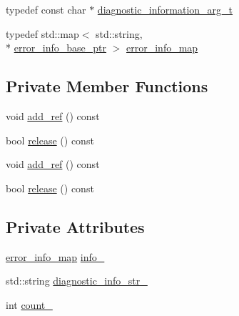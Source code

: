 \begin{DoxyCompactItemize}
\item 
typedef const char $\ast$ \hyperlink{classecto_1_1except_1_1error__info__container__impl_a16f5ebd1abcacd60ddbd919ea166958e}{diagnostic\-\_\-information\-\_\-arg\-\_\-t}
\item 
typedef std\-::map$<$ std\-::string, \\*
\hyperlink{classecto_1_1except_1_1error__info__container__impl_a9fbca0758380cb123f790aee77d1d4d8}{error\-\_\-info\-\_\-base\-\_\-ptr} $>$ \hyperlink{classecto_1_1except_1_1error__info__container__impl_a20b3846bc393224fe282eb64a40ee83d}{error\-\_\-info\-\_\-map}
\end{DoxyCompactItemize}
\subsection*{Private Member Functions}
\begin{DoxyCompactItemize}
\item 
void \hyperlink{classecto_1_1except_1_1error__info__container__impl_ae931c5c31454852cdf3d1a84d1d588eb}{add\-\_\-ref} () const 
\item 
bool \hyperlink{classecto_1_1except_1_1error__info__container__impl_a59b8d31c21da10236de67f0a5bfdf4dd}{release} () const 
\item 
void \hyperlink{classecto_1_1except_1_1error__info__container__impl_ae931c5c31454852cdf3d1a84d1d588eb}{add\-\_\-ref} () const 
\item 
bool \hyperlink{classecto_1_1except_1_1error__info__container__impl_a59b8d31c21da10236de67f0a5bfdf4dd}{release} () const 
\end{DoxyCompactItemize}
\subsection*{Private Attributes}
\begin{DoxyCompactItemize}
\item 
\hyperlink{classecto_1_1except_1_1error__info__container__impl_a20b3846bc393224fe282eb64a40ee83d}{error\-\_\-info\-\_\-map} \hyperlink{classecto_1_1except_1_1error__info__container__impl_a8ec60b174805696bd691a894b7f4109f}{info\-\_\-}
\item 
std\-::string \hyperlink{classecto_1_1except_1_1error__info__container__impl_aeb86496a5127e19e9f787e77531b1b83}{diagnostic\-\_\-info\-\_\-str\-\_\-}
\item 
int \hyperlink{classecto_1_1except_1_1error__info__container__impl_ade4abdc4aa11c62dd39847bc4f6c619c}{count\-\_\-}
\end{DoxyCompactItemize}
